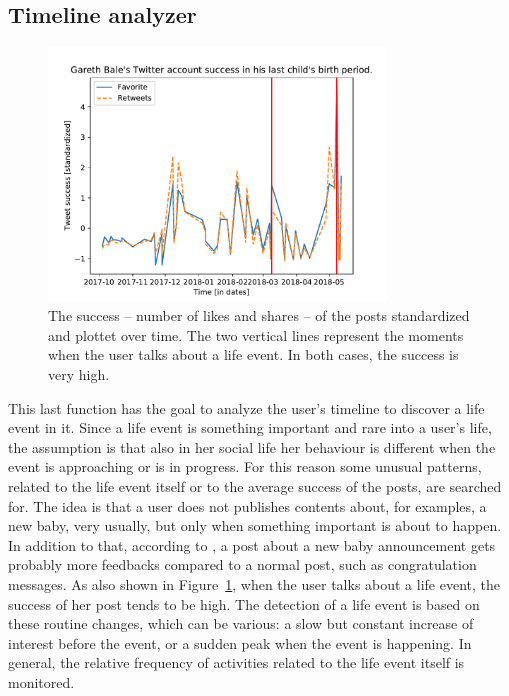 \subsection{Timeline analyzer}
\label{sec:computationperformer}

\begin{figure}
\centering
\includegraphics[width=%
0.8\textwidth]{img/bale}
\caption{The success -- number of likes and shares -- of the posts standardized and plottet over time. The two vertical lines represent the moments when the user talks about a life event. In both cases, the success is very high.}
\label{fig:bale}
\end{figure}

This last function has the goal to analyze the user's timeline to discover a life event in it. Since a life event is something important and rare into a user's life, the assumption is that also in her social life her behaviour is different when the event is approaching or is in progress. For this reason some unusual patterns, related to the life event itself or to the average success of the posts, are searched for. The idea is that a user does not publishes contents about, for examples, a new baby, very usually, but only when something important is about to happen. In addition to that, according to \cite{dickinson2015identifying}, a post about a new baby announcement gets probably more feedbacks compared to a normal post, such as congratulation messages. As also shown in Figure~\ref{fig:bale}, when the user talks about a life event, the success of her post tends to be high. The detection of a life event is based on these routine changes, which can be various: a slow but constant increase of interest before the event, or a sudden peak when the event is happening. In general, the relative frequency of activities related to the life event itself is monitored.

